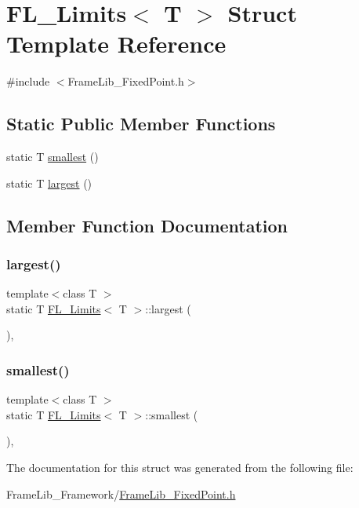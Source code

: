 \hypertarget{struct_f_l___limits}{}\section{F\+L\+\_\+\+Limits$<$ T $>$ Struct Template Reference}
\label{struct_f_l___limits}


{\ttfamily \#include $<$Frame\+Lib\+\_\+\+Fixed\+Point.\+h$>$}

\subsection*{Static Public Member Functions}
\begin{DoxyCompactItemize}
\item 
static T \hyperlink{struct_f_l___limits_a59db5350af5e7253aff0fb348913c2cf}{smallest} ()
\item 
static T \hyperlink{struct_f_l___limits_a38b905652f36709bbad943800945ed4e}{largest} ()
\end{DoxyCompactItemize}


\subsection{Member Function Documentation}
\mbox{\label{struct_f_l___limits_a38b905652f36709bbad943800945ed4e}} 
\subsubsection{\texorpdfstring{largest()}{largest()}}
{\footnotesize\ttfamily template$<$class T $>$ \\
static T \hyperlink{struct_f_l___limits}{F\+L\+\_\+\+Limits}$<$ T $>$\+::largest (\begin{DoxyParamCaption}{ }\end{DoxyParamCaption})\hspace{0.3cm}{\ttfamily [inline]}, {\ttfamily [static]}}

\mbox{\label{struct_f_l___limits_a59db5350af5e7253aff0fb348913c2cf}} 
\subsubsection{\texorpdfstring{smallest()}{smallest()}}
{\footnotesize\ttfamily template$<$class T $>$ \\
static T \hyperlink{struct_f_l___limits}{F\+L\+\_\+\+Limits}$<$ T $>$\+::smallest (\begin{DoxyParamCaption}{ }\end{DoxyParamCaption})\hspace{0.3cm}{\ttfamily [inline]}, {\ttfamily [static]}}



The documentation for this struct was generated from the following file\+:\begin{DoxyCompactItemize}
\item 
Frame\+Lib\+\_\+\+Framework/\hyperlink{_frame_lib___fixed_point_8h}{Frame\+Lib\+\_\+\+Fixed\+Point.\+h}\end{DoxyCompactItemize}
